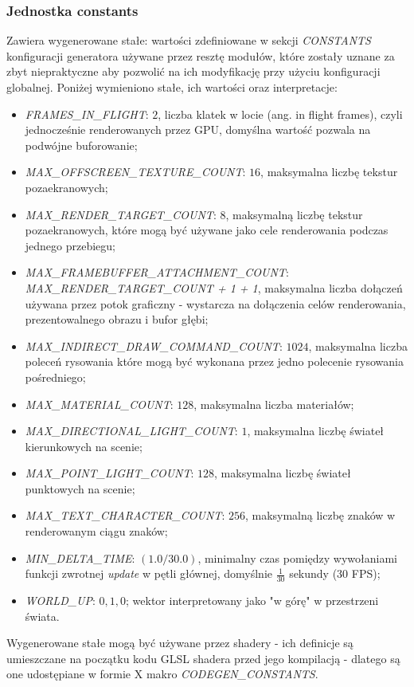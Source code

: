 \subsubsection{Jednostka constants}
Zawiera wygenerowane stałe: wartości zdefiniowane w sekcji \textit{CONSTANTS} konfiguracji generatora używane przez resztę modułów, które zostały uznane za zbyt niepraktyczne aby pozwolić na ich modyfikację przy użyciu konfiguracji globalnej.
Poniżej wymieniono stałe, ich wartości oraz interpretacje:
\begin{itemize}
	\item \textit{FRAMES\_IN\_FLIGHT}: $2$, liczba klatek w locie (ang. in flight frames), czyli jednocześnie renderowanych przez GPU, domyślna wartość pozwala na podwójne buforowanie; 
	\item \textit{MAX\_OFFSCREEN\_TEXTURE\_COUNT}: $16$, maksymalna liczbę tekstur pozaekranowych;
	\item \textit{MAX\_RENDER\_TARGET\_COUNT}: $8$, maksymalną liczbę tekstur pozaekranowych, które mogą być używane jako cele renderowania podczas jednego przebiegu; 
	\item \textit{MAX\_FRAMEBUFFER\_ATTACHMENT\_COUNT}: \textit{MAX\_RENDER\_TARGET\_COUNT + 1 + 1}, maksymalna liczba dołączeń używana przez potok graficzny - wystarcza na dołączenia celów renderowania, prezentowalnego obrazu i bufor głębi;
	\item \textit{MAX\_INDIRECT\_DRAW\_COMMAND\_COUNT}: $1024$, maksymalna liczba poleceń rysowania które mogą być wykonana przez jedno polecenie rysowania pośredniego;
	\item \textit{MAX\_MATERIAL\_COUNT}: $128$, maksymalna liczba materiałów;
	\item \textit{MAX\_DIRECTIONAL\_LIGHT\_COUNT}: $1$, maksymalna liczbę świateł kierunkowych na scenie;
	\item \textit{MAX\_POINT\_LIGHT\_COUNT}: $128$, maksymalna liczbę świateł punktowych na scenie;
	\item \textit{MAX\_TEXT\_CHARACTER\_COUNT}: $256$, maksymalną liczbę znaków w renderowanym ciągu znaków;
	\item \textit{MIN\_DELTA\_TIME}: $(1.0 / 30.0)$, minimalny czas pomiędzy wywołaniami funkcji zwrotnej \textit{update} w pętli głównej, domyślnie $\frac{1}{30}$ sekundy (30 FPS);
	\item \textit{WORLD\_UP}: $0, 1, 0$; wektor interpretowany jako "w górę" w przestrzeni świata.
\end{itemize}

Wygenerowane stałe mogą być używane przez shadery - ich definicje są umieszczane na początku kodu GLSL shadera przed jego kompilacją - dlatego są one udostępiane w formie X makro \textit{CODEGEN\_CONSTANTS}.

